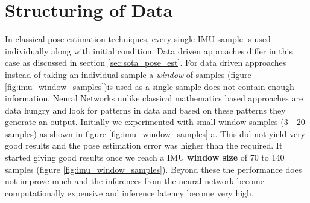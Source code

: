 \section{Structuring of Data}
\label{sec:data_structure}
In classical pose-estimation techniques, every single IMU sample is used individually along with initial condition. Data driven approaches differ in this case as discussed in section \ref{sec:sota_pose_est}. For data driven approaches instead of taking an individual sample a \textit{window} of samples (figure \ref{fig:imu_window_samples})is used as a single sample does not contain enough information. Neural Networks unlike classical mathematics based approaches are data hungry and look for patterns in data and based on these patterns they generate an output. Initially we experimented with small window samples (3 - 20 samples) as shown in figure \ref{fig:imu_window_samples} a. This did not yield very good results and the pose estimation error was higher than the required. It started giving good results once we reach a IMU \textbf{ window size} of 70 to 140 samples (figure \ref{fig:imu_window_samples}). Beyond these the performance does not improve much and the inferences from the neural network become computationally expensive and inference latency become very high.

